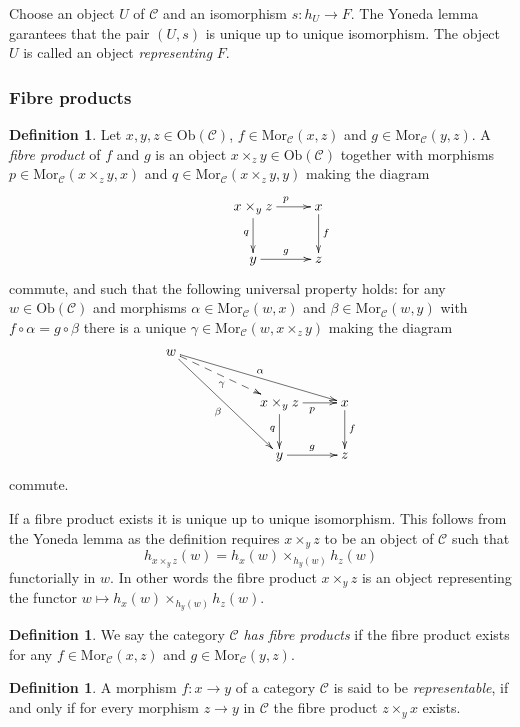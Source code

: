 \documentclass{amsart}
\theoremstyle{definition}
\newtheorem{definition}[theorem]{Definition}
\theoremstyle{remark}
\numberwithin{equation}{subsection}
\begin{document}
\noindent
Choose an object $U$ of $\mathcal{C}$ and an isomorphism $s : h_U \to F$.
The Yoneda lemma garantees that the pair $(U, s)$ 
is unique up to unique isomorphism. The object
$U$ is called an object {\it representing} $F$.

\subsubsection{Fibre products}
\label{subsubsection-fibre-products}

\begin{definition}
\label{definition-fibre-products}
Let $x,y,z\in \text{Ob}(\mathcal{C})$,
$f\in \text{Mor}_{\mathcal{C}}(x,z)$
and $g\in \text{Mor}_{\mathcal C}(y,z)$.
A {\it fibre product} of $f$ and $g$ is
an object $x\times_z y\in \text{Ob}(\mathcal{C})$
together with morphisms 
$p\in \text{Mor}_{\mathcal C}(x\times_z y,x)$ and 
$q\in\text{Mor}_{\mathcal C}(x\times_z y,y)$ making the diagram
$$
\xymatrix{
&x\times_y z \ar[r]^{p} \ar[d]_{q} & x \ar[d]^{f} \\
&y \ar[r]^{g} & z }
$$
commute, and such that the following universal property holds: for
any $w\in \text{Ob}(\mathcal{C})$ and morphisms 
$\alpha \in \text{Mor}_{\mathcal C}(w,x)$ and 
$\beta \in \text{Mor}_{\mathcal{C}}(w,y)$ with $f \circ \alpha= g\circ \beta$
there is a unique $\gamma\in \text{Mor}_{\mathcal C}(w,x\times_z y)$ making
the diagram
$$
\xymatrix{
w\ar[rrrd]^\alpha \ar@{-->}[rrd]_\gamma \ar[rrdd]_\beta &&\\
&&x\times_y z \ar[r]_{p} \ar[d]_{q} & x \ar[d]^{f} \\
&&y \ar[r]^{g} & z }
$$
commute.
\end{definition}

\noindent
If a fibre product exists it is unique up to unique
isomorphism. This follows from the Yoneda lemma as
the definition requires $x\times_yz$ to be an object
of $\mathcal{C}$ such that
$$
h_{x\times_y z}(w) = h_x(w) \times_{h_y(w)} h_z(w)
$$
functorially in $w$. In other words the fibre product $x\times_yz$
is an object representing the functor
$w \mapsto h_x(w) \times_{h_y(w)} h_z(w)$.

\begin{definition}
\label{definition-has-fibre-products}
We say the category $\mathcal{C}$ {\it has fibre products} if
the fibre product exists for any $f\in \text{Mor}_{\mathcal C}(x,z)$
and $g\in \text{Mor}_{\mathcal C}(y,z)$.
\end{definition}

\begin{definition}
\label{definition-representable-morphism}
A morphism $f : x \to y$ of a category $\mathcal{C}$ is said to be
{\it representable}, if and only if for every morphism $z \to y$
in $\mathcal{C}$ the fibre product $z\times_y x$ exists.
\end{definition}
\end{document}
